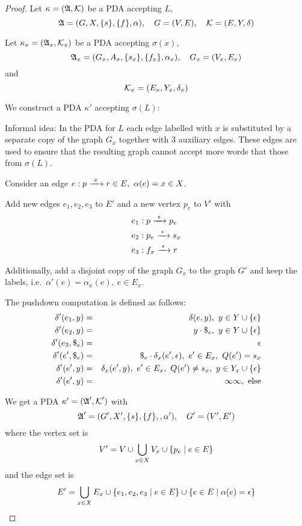 \begin{proof}
Let $\kappa = (\mbox{$\mathfrak{A}$}, \mbox{$\mathcal{K}$})$ be a PDA accepting $L$,
\[ \mbox{$\mathfrak{A}$}=(G, X, \mbox{$\{s\}$}, \mbox{$\{f\}$}, \alpha),\quad G=(V,E),\quad
\mbox{$\mathcal{K}$}=(E, Y, \delta)
\]

Let $\kappa_x = (\mbox{$\mathfrak{A}$}_x, \mbox{$\mathcal{K}$}_x)$ be a PDA accepting $\sigma(x)$,
\[ \mbox{$\mathfrak{A}$}_x = (G_x, A_x, \mbox{$\{s_x\}$}, \mbox{$\{f_x\}$}, \alpha_x),\quad G_x=(V_x,
E_x) \] and
\[ \mbox{$\mathcal{K}$}_x = (E_x, Y_x, \delta_x) \]

We construct a PDA $\kappa'$ accepting $\sigma(L)$:

Informal idea: In the PDA for $L$ each edge labelled with $x$ is substituted by
a separate copy of the graph $G_x$ together with 3 auxiliary edges. These edges
are used to ensure that the resulting graph cannot accept more words that those
from $\sigma(L)$.

\missingfigure

Consider an edge $e: p \edge{x} r \in E,\ \alpha(e)=x\in X$.

Add new edges $e_1, e_2, e_3$ to $E'$ and a new vertex $p_e$ to $V'$ with
\begin{eqnarray*}
& e_1: p \xrightarrow{\ {\epsilon}\ } p_e \\
& e_2: p_e \xrightarrow{\ {\epsilon}\ } s_x \\
& e_3: f_x \xrightarrow{\ {\epsilon}\ } r
\end{eqnarray*}

Additionally, add a disjoint copy of the graph $G_x$ to the graph $G'$ and keep
the labels, i.e.\ $\alpha'(e) = \alpha_x(e),\ e\in E_x$.

The pushdown computation is defined as follows:
\begin{eqnarray*}
\delta'(e_1, y) &=& \delta(e, y),\ y\in Y\cup\setof{\epsilon} \\
\delta'(e_2, y) &=& y \cdot {\$}_e,\ y\in Y\cup\setof{\epsilon} \\
\delta'(e_3, {\$}_e) &=& \epsilon \\
\delta'(e', {\$}_e) &=& {\$}_e \cdot \delta_x(e', \epsilon),\ e'\in E_x,\ Q(e')
=s_x \\
\delta'(e', y) &=& \delta_x(e', y),\ e'\in E_x,\ Q(e')\neq s_x,\ y\in Y_x \cup
\setof{\epsilon} \\
\delta'(e', y) &=& \infty\infty,\text{ else}
\end{eqnarray*}

We get a PDA $\kappa' = (\mbox{$\mathfrak{A}$}', \mbox{$\mathcal{K}$}')$ with
\[ \mbox{$\mathfrak{A}$}' = (G', X', \mbox{$\{s\}$}, \mbox{$\{f\}$}, ,\alpha'),\quad G'=(V',E') \]
where the vertex set is
\[ V' = V \cup \bigcup_{x \in X} V_x \cup \mbox{$\{p_e \mid e \in E\}$} \]
and the edge set is
\[ E' = \bigcup_{x \in X} E_x \cup \mbox{$\{e_1, e_2, e_3 \mid e \in E\}$} \cup
\mbox{$\{e \in E \mid \alpha(e) = \epsilon\}$} \]


\end{proof}
